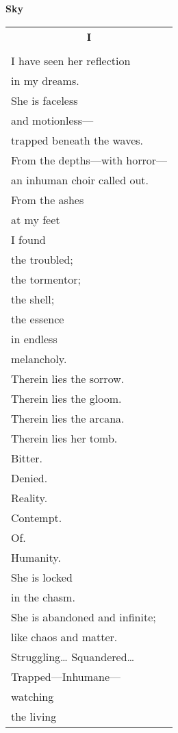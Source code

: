 \documentclass{article}
\begin{document}
\newcommand{\h}{\hspace*{2ex}}
\newcommand{\HHHH}{\hspace*{32ex}}
\begin{center}
{\large\textbf{Sky}} \\
\begin{tabular}{l}
\multicolumn{1}{c}{\large\textbf{I}} \\
\\
I have seen her reflection \\
\h in my dreams. \\
She is faceless \\
\h and motionless--- \\
\h\h trapped beneath the waves. \\ %
From the depths---with horror--- \\
\h an inhuman choir called out. \\ %
From the ashes \\
\h at my feet \\
\h\h I found \\
the troubled; \\
\h the tormentor; \\
\h\h the shell; \\
\h\h\h the essence \\ %
in endless \\
\h melancholy.\\
Therein lies the sorrow. \\
Therein lies the gloom. \\
Therein lies the arcana. \\
Therein lies her tomb. \\
\h Bitter. \\
\h\h Denied. \\
\h\h\h Reality. \\
\h Contempt. \\
\h\h Of. \\
\h\h\h Humanity. \\
She is locked \\
\h in the chasm. \\
She is abandoned and infinite; \\
\h like chaos and matter. \\ %
Struggling\ldots{} Squandered\ldots \\
\h Trapped---Inhumane--- \\
\h\h watching \\
\h\h\h the living \\

\end{tabular}
\end{center}
\end{document}
